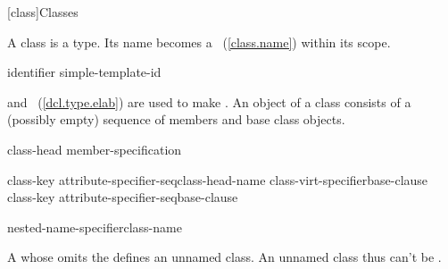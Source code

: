 [class]{Classes}%



\pnum
{}%
%
%
%
A class is a type.
%
Its name becomes a ~(\ref{class.name}) within its
scope.

\begin{bnf}
\br
    identifier\br
    simple-template-id
\end{bnf}

 and
~(\ref{dcl.type.elab}) are used to
make . An object of a class consists of a
(possibly empty) sequence of members and base class objects.

\begin{bnf}
\br
    class-head \terminal{\{} member-specification\opt \terminal{\}}
\end{bnf}

\begin{bnf}
\br
    class-key attribute-specifier-seq\opt class-head-name class-virt-specifier\opt base-clause\opt\br
    class-key attribute-specifier-seq\opt base-clause\opt
\end{bnf}

\begin{bnf}
\br
    nested-name-specifier\opt class-name
\end{bnf}

\begin{bnf}
\br
\end{bnf}

\begin{bnf}
\br
    \br
    \br
\end{bnf}

A  whose
 omits the
 defines an unnamed class. \enternote An unnamed class thus can't
be . \exitnote

